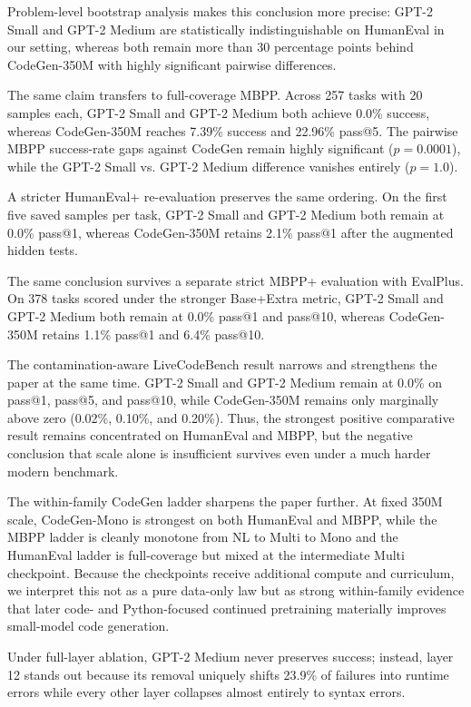 \documentclass[preprint,12pt,authoryear]{elsarticle}
\begin{document}
Problem-level bootstrap analysis makes this conclusion more precise: GPT-2 Small and GPT-2 Medium are statistically indistinguishable on HumanEval in our setting, whereas both remain more than 30 percentage points behind CodeGen-350M with highly significant pairwise differences.

The same claim transfers to full-coverage MBPP. Across 257 tasks with 20 samples each, GPT-2 Small and GPT-2 Medium both achieve 0.0\% success, whereas CodeGen-350M reaches 7.39\% success and 22.96\% pass@5. The pairwise MBPP success-rate gaps against CodeGen remain highly significant ($p=0.0001$), while the GPT-2 Small vs. GPT-2 Medium difference vanishes entirely ($p=1.0$).

A stricter HumanEval+ re-evaluation preserves the same ordering. On the first five saved samples per task, GPT-2 Small and GPT-2 Medium both remain at 0.0\% pass@1, whereas CodeGen-350M retains 2.1\% pass@1 after the augmented hidden tests.

The same conclusion survives a separate strict MBPP+ evaluation with EvalPlus. On 378 tasks scored under the stronger Base+Extra metric, GPT-2 Small and GPT-2 Medium both remain at 0.0\% pass@1 and pass@10, whereas CodeGen-350M retains 1.1\% pass@1 and 6.4\% pass@10.

The contamination-aware LiveCodeBench result narrows and strengthens the paper at the same time. GPT-2 Small and GPT-2 Medium remain at 0.0\% on pass@1, pass@5, and pass@10, while CodeGen-350M remains only marginally above zero (0.02\%, 0.10\%, and 0.20\%). Thus, the strongest positive comparative result remains concentrated on HumanEval and MBPP, but the negative conclusion that scale alone is insufficient survives even under a much harder modern benchmark.

The within-family CodeGen ladder sharpens the paper further. At fixed 350M scale, CodeGen-Mono is strongest on both HumanEval and MBPP, while the MBPP ladder is cleanly monotone from NL to Multi to Mono and the HumanEval ladder is full-coverage but mixed at the intermediate Multi checkpoint. Because the checkpoints receive additional compute and curriculum, we interpret this not as a pure data-only law but as strong within-family evidence that later code- and Python-focused continued pretraining materially improves small-model code generation.

Under full-layer ablation, GPT-2 Medium never preserves success; instead, layer 12 stands out because its removal uniquely shifts 23.9\% of failures into runtime errors while every other layer collapses almost entirely to syntax errors.
\end{document}

